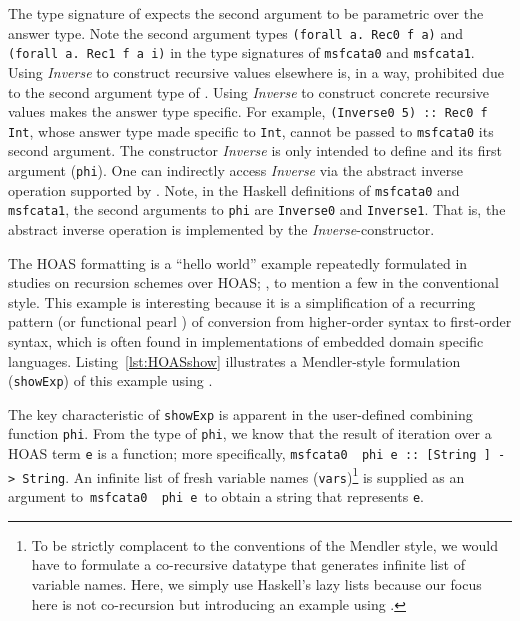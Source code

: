 The type signature of \msfit{} expects the second argument to be
parametric over the answer type. Note the second argument types
\lstinline{(forall a. Rec0 f a)} and \lstinline{(forall a. Rec1 f a i)}
in the type signatures of \lstinline{msfcata0} and \lstinline{msfcata1}. 
Using \textit{Inverse} to construct recursive values elsewhere is, in a way,
prohibited due to the second argument type of \msfit{}. Using \textit{Inverse}
to construct concrete recursive values makes the answer type specific.
For example, \lstinline{(Inverse0 5) :: Rec0 f Int}, whose answer type
made specific to \lstinline{Int}, cannot be passed to \lstinline{msfcata0}
its second argument. The constructor \textit{Inverse} is only intended to
define \msfit{} and its first argument (\lstinline{phi}). One can indirectly
access \textit{Inverse} via the abstract inverse operation supported by
\msfit{}. Note, in the Haskell definitions of \lstinline{msfcata0} and
\lstinline{msfcata1}, the second arguments to \lstinline{phi} are
\lstinline{Inverse0} and \lstinline{Inverse1}. That is, the abstract inverse
operation is implemented by the \textit{Inverse}-constructor.

\begin{figure}

\vspace*{-4ex}
\end{figure}

The HOAS formatting is a ``hello world'' example repeatedly formulated
in studies on recursion schemes over HOAS; \eg, \cite{FegShe96,bgb,BahHvi12}
to mention a few in the conventional style. This example is interesting because it
is a simplification of a recurring pattern (or functional pearl \cite{AxeCla13})
of conversion from higher-order syntax to first-order syntax, which is often
found in implementations of embedded domain specific languages.
Listing~\ref{lst:HOASshow} illustrates a Mendler-style formulation
(\lstinline{showExp}) of this example using \msfit{}.


The key characteristic of \lstinline{showExp} is apparent in the user-defined
combining function \lstinline{phi}. From the type of \lstinline{phi}, we know
that the result of iteration over a HOAS term \lstinline{e} is a function;
more specifically,
\lstinline{msfcata0  phi e :: [String ] -> String}. An infinite list of
fresh variable names (\lstinline{vars})\footnote{
	To be strictly complacent to the conventions of the Mendler style,
	we would have to formulate a co-recursive datatype
	that generates infinite list of variable names.
	Here, we simply use Haskell's lazy lists because our focus here is
	not co-recursion but introducing an example using \msfit{}.}
is supplied as an argument to \,\lstinline{msfcata0  phi e}\, to obtain
a string that represents \lstinline{e}.

